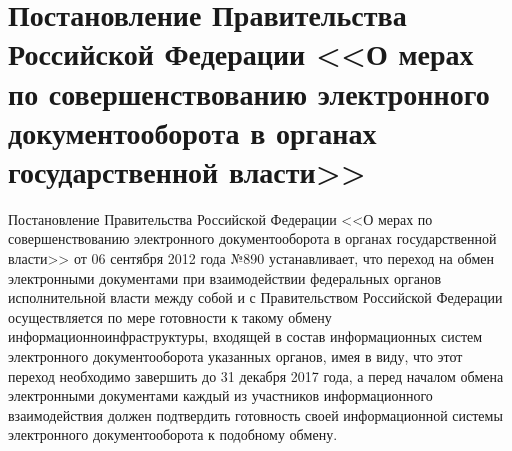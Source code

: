 \section{Постановление Правительства Российской Федерации <<О мерах по совершенствованию электронного документооборота в органах государственной власти>>} \label{rights_gov_890}

Постановление Правительства Российской Федерации <<О мерах по совершенствованию электронного документооборота в органах государственной власти>> от 06 сентября 2012 года №890 \cite{gov-890} устанавливает, что переход на обмен электронными документами при взаимодействии федеральных органов исполнительной власти между собой и с Правительством Российской Федерации осуществляется по мере готовности к такому обмену информационно инфраструктуры, входящей в состав информационных систем электронного документооборота указанных органов, имея в виду, что этот переход необходимо завершить до 31 декабря 2017 года, а перед началом обмена электронными документами каждый из участников информационного взаимодействия должен подтвердить готовность своей информационной системы электронного документооборота к подобному обмену.